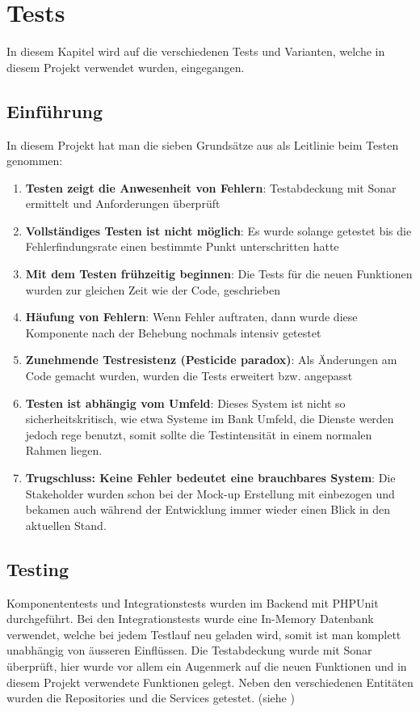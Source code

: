 %
%

\chapter{Tests}\label{chap.tests} 
In diesem Kapitel wird auf die verschiedenen Tests und Varianten, welche in diesem Projekt verwendet wurden, eingegangen.

\section{Einführung}
In diesem Projekt hat man die sieben Grundsätze aus \cite{test_soft_book} als Leitlinie beim Testen genommen:
\begin{enumerate}
\item \textbf{Testen zeigt die Anwesenheit von Fehlern}: Testabdeckung mit Sonar ermittelt und Anforderungen überprüft
\item \textbf{Vollständiges Testen ist nicht möglich}: Es wurde solange getestet bis die Fehlerfindungsrate einen bestimmte Punkt unterschritten hatte
\item \textbf{Mit dem Testen frühzeitig beginnen}: Die Tests für die neuen Funktionen wurden zur gleichen Zeit wie der Code, geschrieben
\item \textbf{Häufung von Fehlern}: Wenn Fehler auftraten, dann wurde diese Komponente nach der Behebung nochmals intensiv getestet
\item \textbf{Zunehmende Testresistenz (Pesticide paradox)}: Als Änderungen am Code gemacht wurden, wurden die Tests erweitert bzw. angepasst
\item \textbf{Testen ist abhängig vom Umfeld}: Dieses System ist nicht so sicherheitskritisch, wie etwa Systeme im Bank Umfeld, die Dienste werden jedoch rege benutzt, somit sollte die Testintensität in einem normalen Rahmen liegen.
\item \textbf{Trugschluss: Keine Fehler bedeutet eine brauchbares System}: Die Stakeholder wurden schon bei der Mock-up Erstellung mit einbezogen und bekamen auch während der Entwicklung immer wieder einen Blick in den aktuellen Stand.
\end{enumerate}

\section{Testing}
Komponententests und Integrationstests wurden im Backend mit PHPUnit durchgeführt. Bei den Integrationstests wurde eine In-Memory Datenbank verwendet, welche bei jedem Testlauf neu geladen wird, somit ist man komplett unabhängig von äusseren Einflüssen. Die Testabdeckung wurde mit Sonar überprüft, hier wurde vor allem ein Augenmerk auf die neuen Funktionen und in diesem Projekt verwendete Funktionen gelegt. Neben den verschiedenen Entitäten wurden die Repositories und die Services getestet. (siehe \cite{test_soft_book})

